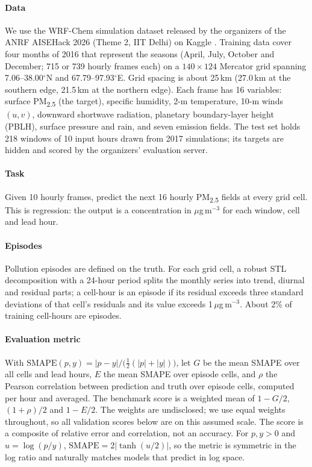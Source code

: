 \documentclass[10pt]{article}
\newcommand{\PM}{PM\textsubscript{2.5}}
\begin{document}
\paragraph{Data}
We use the WRF-Chem simulation dataset released by the organizers of the ANRF AISEHack 2026 (Theme 2, IIT Delhi) on Kaggle \citep{aisehack2026}. Training data cover four months of 2016 that represent the seasons (April, July, October and December; 715 or 739 hourly frames each) on a $140\times124$ Mercator grid spanning 7.06--38.00$^\circ$N and 67.79--97.93$^\circ$E. Grid spacing is about 25\,km (27.0\,km at the southern edge, 21.5\,km at the northern edge). Each frame has 16 variables: surface \PM{} (the target), specific humidity, 2-m temperature, 10-m winds $(u,v)$, downward shortwave radiation, planetary boundary-layer height (PBLH), surface pressure and rain, and seven emission fields. The test set holds 218 windows of 10 input hours drawn from 2017 simulations; its targets are hidden and scored by the organizers' evaluation server.

\paragraph{Task}
Given 10 hourly frames, predict the next 16 hourly \PM{} fields at every grid cell. This is regression: the output is a concentration in $\mu$g\,m$^{-3}$ for each window, cell and lead hour.

\paragraph{Episodes}
Pollution episodes are defined on the truth. For each grid cell, a robust STL decomposition \citep{cleveland1990} with a 24-hour period splits the monthly series into trend, diurnal and residual parts; a cell-hour is an episode if its residual exceeds three standard deviations of that cell's residuals and its value exceeds 1\,$\mu$g\,m$^{-3}$. About 2\% of training cell-hours are episodes.

\paragraph{Evaluation metric}
With $\mathrm{SMAPE}(p,y)=|p-y|/\big(\tfrac12(|p|+|y|)\big)$, let $G$ be the mean SMAPE over all cells and lead hours, $E$ the mean SMAPE over episode cells, and $\rho$ the Pearson correlation between prediction and truth over episode cells, computed per hour and averaged. The benchmark score is a weighted mean of $1-G/2$, $(1+\rho)/2$ and $1-E/2$. The weights are undisclosed; we use equal weights throughout, so all validation scores below are on this assumed scale. The score is a composite of relative error and correlation, not an accuracy. For $p,y>0$ and $u=\log(p/y)$, $\mathrm{SMAPE}=2|\tanh(u/2)|$, so the metric is symmetric in the log ratio and naturally matches models that predict in log space.
\end{document}
